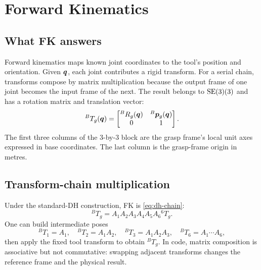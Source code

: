 \chapter{Forward Kinematics}
\label{ch:fk}

\section{What FK answers}
Forward kinematics maps known joint coordinates to the tool's position and
orientation. Given $\bm{q}$, each joint contributes a rigid transform. For a
serial chain, transforms compose by matrix multiplication because the output
frame of one joint becomes the input frame of the next. The result belongs to
$\mathrm{SE}(3)(3)$ and has a rotation matrix and translation vector:
\begin{equation}
 {}^BT_g(\bm{q})=
 \begin{bmatrix}{}^BR_g(\bm{q})&{}^B\bm{p}_g(\bm{q})\\0&1\end{bmatrix}.
 \label{eq:fk-result}
\end{equation}
The first three columns of the 3-by-3 block are the grasp frame's local unit
axes expressed in base coordinates. The last column is the grasp-frame origin
in metres.

\section{Transform-chain multiplication}
Under the standard-DH construction, FK is \cref{eq:dh-chain}:
\begin{equation}
 {}^BT_g=A_1A_2A_3A_4A_5A_6{}^6T_g.
\end{equation}
One can build intermediate poses
\begin{equation}
 {}^BT_1=A_1,\quad {}^BT_2=A_1A_2,\quad
 {}^BT_3=A_1A_2A_3,\quad {}^BT_6=A_1\cdots A_6,
\end{equation}
then apply the fixed tool transform to obtain ${}^BT_g$. In code, matrix
composition is associative but not commutative: swapping adjacent transforms
changes the reference frame and the physical result.

